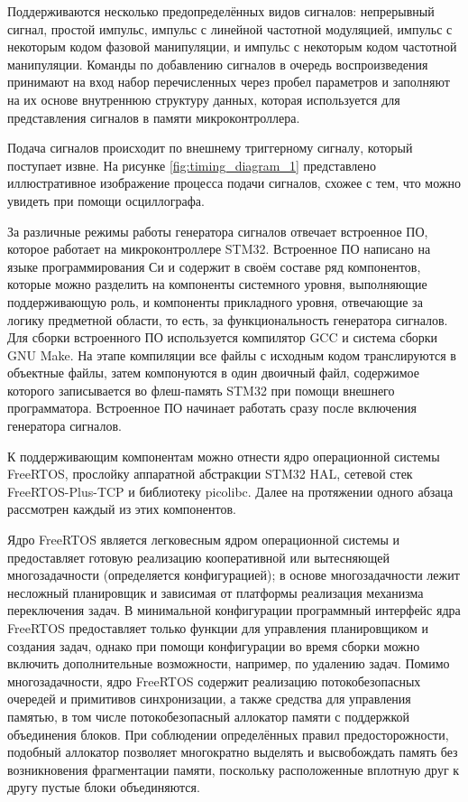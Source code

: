 \documentclass{report}
\begin{document}
Поддерживаются несколько предопределённых видов сигналов: непрерывный сигнал, простой импульс, импульс с линейной частотной модуляцией, импульс с некоторым кодом фазовой манипуляции, и импульс с некоторым кодом частотной манипуляции. Команды по добавлению сигналов в очередь воспроизведения принимают на вход набор перечисленных через пробел параметров и заполняют на их основе внутреннюю структуру данных, которая используется для представления сигналов в памяти микроконтроллера.

Подача сигналов происходит по внешнему триггерному сигналу, который поступает извне. На рисунке \ref{fig:timing_diagram_1} представлено иллюстративное изображение процесса подачи сигналов, схожее с тем, что можно увидеть при помощи осциллографа.


За различные режимы работы генератора сигналов отвечает встроенное ПО, которое работает на микроконтроллере STM32. Встроенное ПО написано на языке программирования Си и содержит в своём составе ряд компонентов, которые можно разделить на компоненты системного уровня, выполняющие поддерживающую роль, и компоненты прикладного уровня, отвечающие за логику предметной области, то есть, за функциональность генератора сигналов. Для сборки встроенного ПО используется компилятор GCC и система сборки GNU Make. На этапе компиляции все файлы с исходным кодом транслируются в объектные файлы, затем компонуются в один двоичный файл, содержимое которого записывается во флеш-память STM32 при помощи внешнего программатора. Встроенное ПО начинает работать сразу после включения генератора сигналов.

К поддерживающим компонентам можно отнести ядро операционной системы FreeRTOS, прослойку аппаратной абстракции STM32 HAL, сетевой стек FreeRTOS-Plus-TCP и библиотеку picolibc. Далее на протяжении одного абзаца рассмотрен каждый из этих компонентов.

Ядро FreeRTOS является легковесным ядром операционной системы и предоставляет готовую реализацию кооперативной или вытесняющей многозадачности (определяется конфигурацией); в основе многозадачности лежит несложный планировщик и зависимая от платформы реализация механизма переключения задач. В минимальной конфигурации программный интерфейс ядра FreeRTOS предоставляет только функции для управления планировщиком и создания задач, однако при помощи конфигурации во время сборки можно включить дополнительные возможности, например, по удалению задач. Помимо многозадачности, ядро FreeRTOS содержит реализацию потокобезопасных очередей и примитивов синхронизации, а также средства для управления памятью, в том числе потокобезопасный аллокатор памяти с поддержкой объединения блоков. При соблюдении определённых правил предосторожности, подобный аллокатор позволяет многократно выделять и высвобождать память без возникновения фрагментации памяти, поскольку расположенные вплотную друг к другу пустые блоки объединяются.
\end{document}
